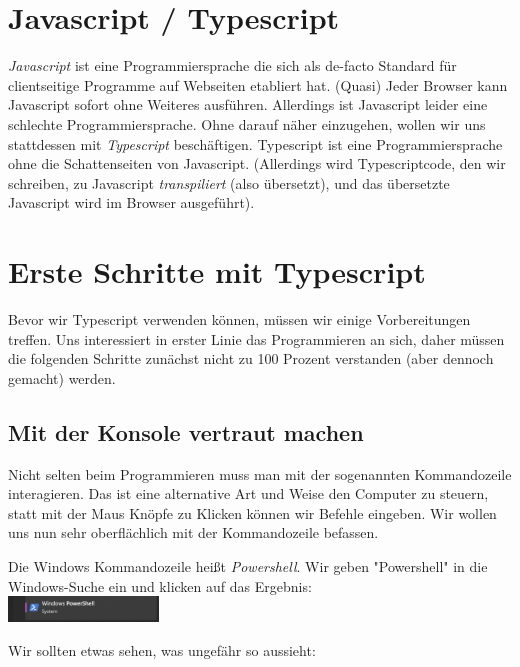 \documentclass[11pt]{article}
\begin{document}
    \section{Javascript / Typescript}

    \textit{Javascript} ist eine Programmiersprache die sich als de-facto Standard für clientseitige Programme auf Webseiten
    etabliert hat.
    (Quasi) Jeder Browser kann Javascript sofort ohne Weiteres ausführen.
    Allerdings ist Javascript leider eine schlechte Programmiersprache.
    Ohne darauf näher einzugehen, wollen wir uns stattdessen mit \textit{Typescript} beschäftigen.
    Typescript ist eine Programmiersprache ohne die Schattenseiten von Javascript.
    (Allerdings wird Typescriptcode, den wir schreiben, zu Javascript \textit{transpiliert} (also übersetzt), und das
    übersetzte Javascript wird im Browser ausgeführt).


    \section{Erste Schritte mit Typescript}

    Bevor wir Typescript verwenden können, müssen wir einige Vorbereitungen treffen.
    Uns interessiert in erster Linie das Programmieren an sich, daher müssen die folgenden Schritte zunächst
    nicht zu 100 Prozent verstanden (aber dennoch gemacht) werden.

    \subsection{Mit der Konsole vertraut machen}

    Nicht selten beim Programmieren muss man mit der sogenannten Kommandozeile interagieren.
    Das ist eine alternative Art und Weise den Computer zu steuern, statt mit der Maus Knöpfe zu Klicken
    können wir Befehle eingeben.
    Wir wollen uns nun sehr oberflächlich mit der Kommandozeile befassen.

    Die Windows Kommandozeile heißt \textit{Powershell}.
    Wir geben "Powershell" in die Windows-Suche ein und klicken auf das Ergebnis: \\

    \includegraphics[width=0.3\textwidth]{powershell}

    Wir sollten etwas sehen, was ungefähr so aussieht: \\
\end{document}

